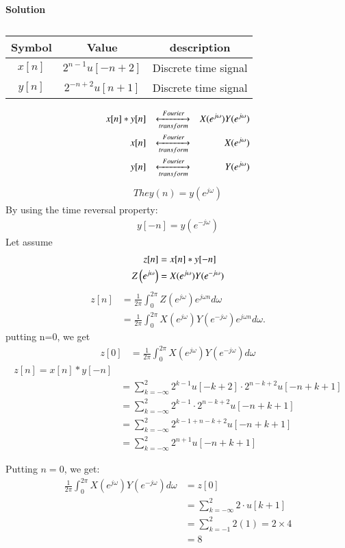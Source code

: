 \documentclass[journal,12pt,twocolumn]{IEEEtran}
\theoremstyle{remark}
\begin{document}
\textbf{Solution}\\
\begin{table}[!h]
\begin{center}
\renewcommand\thetable{1}
\begin{tabular}{ |c|c|c| } 
  \hline
    Symbol & Value & description \\ 
  \hline
  $x[n] $ & $2^{n-1}u[-n+2]$ & Discrete time signal  \\ 
  \hline
  $y[n] $ & $2^{-n+2}u[n+1]$ & Discrete time signal  \\ 
  \hline
\end{tabular}
\end{center}
\caption{}
\end{table}
\begin{align}
     x[n]*y[n] && \xleftrightarrow[transform]{Fourier} && X(e^{j\omega}) Y(e^{j\omega})\\
 x[n] && \xleftrightarrow [transform]{Fourier} && X(e^{j\omega}) \\
 y[n] && \xleftrightarrow [transform]{Fourier} && Y(e^{j\omega}) 
\end{align}
 \begin{align}
      The y(n) = y(e^{j\omega})
\end{align}
By using the time reversal property:
\begin{align}
y[-n] = y(e^{-j\omega})
\end{align}
Let assume
\begin{align}
     z[n]& = x[n] * y[-n]\\
     Z\left(e^{j \omega}\right) &=X(e^{j\omega}) Y(e^{-j\omega})
 \end{align}
\begin{align}
      z[n]& =\frac{1}{2\pi} \int_{0}^{2\pi} Z(e^{j\omega})e^{j \omega n} d\omega \\
      &=\frac{1}{2\pi} \int_{0}^{2\pi}  X(e^{j\omega}) Y(e^{-j\omega})e^{j \omega n} d\omega.
 \end{align}
 putting  n=0, we get
\begin{align}
    z[0]&=\frac{1}{2\pi} \int_{0}^{2\pi} X(e^{j\omega}) Y(e^{-j\omega}) d\omega
\end{align}
\begin{align}
    z[n] = x[n] * y[-n]\\
 &= \sum_{k=-\infty}^{2} 2^{k-1} u[-k+2]\cdot 2^{n-k+2} u[-n+k+1]\\
 &= \sum_{k=-\infty}^{2} 2^{k-1} \cdot 2^{n-k+2} u[-n+k+1]\\
 &= \sum_{k=-\infty}^{2} 2^{k-1+n-k+2} u[-n+k+1]\\
 &= \sum_{k=-\infty}^{2} 2^{n+1} u[-n+k+1]
\end{align}

Putting $n = 0$, we get:
\begin{align}
     \frac{1}{2\pi} \int_{0}^{2\pi} X(e^{j\omega}) Y(e^{-j\omega}) d\omega &= z[0]\\
     &= \sum_{k=-\infty}^{2} 2 \cdot u[k+1] \\
     &=\sum_{k=-1}^{2} 2(1) = 2 \times 4 \\
     &= 8
\end{align}
\end{document}
